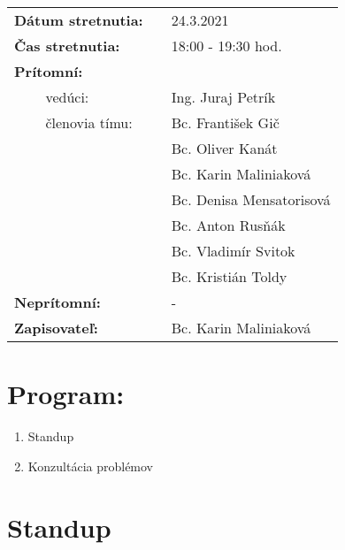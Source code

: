 \documentclass{article}
\begin{document}
    

    \begin{table}[h]
        \begin{tabular}{lllll}
            \multicolumn{3}{l}{\textbf{Dátum stretnutia:}} & & 24.3.2021 \\
            \multicolumn{3}{l}{\textbf{Čas stretnutia:}} & & 18:00 - 19:30 hod. \\
            \multicolumn{3}{l}{\textbf{Prítomní:}} \\
            & & vedúci: & & Ing. Juraj Petrík \\
            & & členovia tímu: & & Bc. František Gič  \\
            & & & & Bc. Oliver Kanát \\
            & & & & Bc. Karin Maliniaková \\
            & & & & Bc. Denisa Mensatorisová \\
            & & & & Bc. Anton Rusňák \\
            & & & & Bc. Vladimír Svitok \\
            & & & & Bc. Kristián Toldy \\
            \multicolumn{3}{l}{\textbf{Neprítomní:}} & & -\\
            \multicolumn{3}{l}{\textbf{Zapisovateľ:}} & & Bc. Karin Maliniaková \\
        \end{tabular}
        \label{tab:grades}
    \end{table}

    \section*{Program:}

    \begin{enumerate}
        \item Standup
        \item Konzultácia problémov
    \end{enumerate}

    \section*{Standup}
\end{document}
